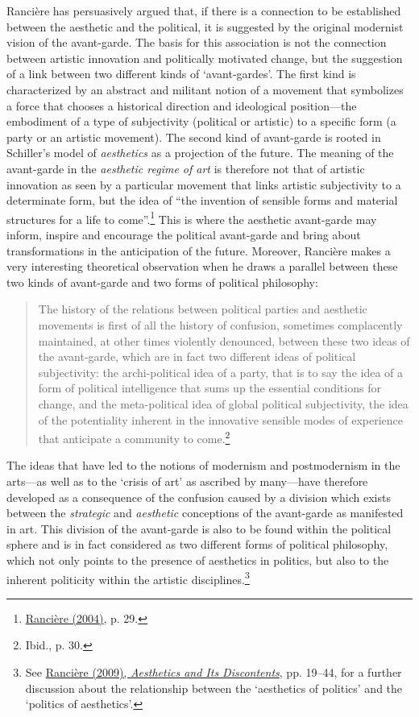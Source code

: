 Ranci\`{e}re has persuasively argued that, if there is a connection to be established between the aesthetic and the political, it is suggested by the original modernist vision of the avant-garde.  The basis for this association is not the connection between artistic innovation and politically motivated change, but the suggestion of a link between two different kinds of `avant-gardes'. The first kind is characterized by an abstract and militant notion of a movement that symbolizes a force that chooses a historical direction and ideological position---the embodiment of a type of subjectivity (political or artistic) to a specific form (a party or an artistic movement). The second kind of avant-garde is rooted in Schiller's model of \emph{aesthetics} as a projection of the future. The meaning of the avant-garde in the \emph{aesthetic regime of art} is therefore not that of artistic innovation as seen by a particular movement that links artistic subjectivity to a determinate form, but the idea of ``the invention of sensible forms and material structures for a life to come''.\footnote{\hyperlink{ranpoli}{Ranci\`{e}re (2004)}, p. 29.} This is where the aesthetic avant-garde may inform, inspire and encourage the political avant-garde and bring about transformations in the anticipation of the future. Moreover, Ranci\`{e}re makes a very interesting theoretical observation when he draws a parallel between these two kinds of avant-garde and two forms of political philosophy:
\begin{quote}
The history of the relations between political parties and aesthetic movements is first of all the history of confusion, sometimes complacently maintained, at other times violently denounced, between these two ideas of the avant-garde, which are in fact two different ideas of political subjectivity: the archi-political idea of a party, that is to say the idea of a form of political intelligence that sums up the essential conditions for change, and the meta-political idea of global political subjectivity, the idea of the potentiality inherent in the innovative sensible modes of experience that anticipate a community to come.\footnote{Ibid., p. 30.}
\end{quote}

The ideas that have led to the notions of modernism and postmodernism in the arts---as well as to the `crisis of art' as ascribed by many---have therefore developed as a consequence of the confusion caused by a division which exists between the \emph{strategic} and \emph{aesthetic} conceptions of the avant-garde as manifested in art. This division of the avant-garde is also to be found within the political sphere and is in fact considered as two different forms of political philosophy, which not only points to the presence of aesthetics in politics, but also to the inherent politicity within the artistic disciplines.\footnote{See \hyperlink{ranaesth}{Ranci\`{e}re (2009), \emph{Aesthetics and Its Discontents}}, pp. 19--44, for a further discussion about the relationship between the `aesthetics of politics' and the `politics of aesthetics'.}

